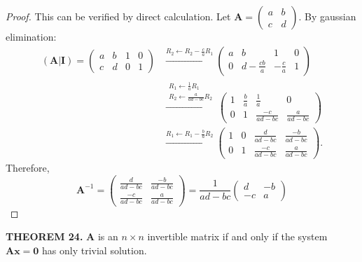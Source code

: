 \documentclass[12pt]{article}
\newcommand{\mat}[1]{\mathbf{#1}}
\newcommand{\theorem}[2]{\textbf{THEOREM #1.} #2}
\begin{document}
\begin{proof}
    This can be verified by direct calculation. Let $\mat{A} = \begin{pmatrix} a & b \\ c & d \end{pmatrix}$. By gaussian elimination:
\begin{align*}
  (\mat{A|I})
= \begin{pmatrix} a & b & 1 & 0 \\ c & d & 0 & 1 \end{pmatrix}
%
&\xrightarrow{R_2 \leftarrow R_2 - \frac{c}{a} R_1}
\begin{pmatrix}
a & b & 1 & 0 \\
0 & d - \frac{cb}{a} & -\frac{c}{a} & 1
\end{pmatrix} \\
%
&\xrightarrow{\substack{R_1 \leftarrow \frac{1}{a} R_1 \\ R_2 \leftarrow \frac{a}{ad - bc} R_2}}
\begin{pmatrix}
1 & \frac{b}{a} & \frac{1}{a} & 0 \\
0 & 1 & \frac{-c}{ad - bc} & \frac{a}{ad - bc}
\end{pmatrix} \\
%
&\xrightarrow{R_1 \leftarrow R_1 - \frac{b}{a} R_2}
\begin{pmatrix}
1 & 0 & \frac{d}{ad - bc} & \frac{-b}{ad - bc} \\
0 & 1 & \frac{-c}{ad - bc} & \frac{a}{ad - bc}
\end{pmatrix}.
\end{align*}
Therefore,
\begin{equation*}
\mat{A}^{-1} =
\begin{pmatrix}
\frac{d}{ad - bc} & \frac{-b}{ad - bc} \\
\frac{-c}{ad - bc} & \frac{a}{ad - bc}
\end{pmatrix}
= \frac{1}{ad-bc} \begin{pmatrix} d & -b \\ -c & a \end{pmatrix}
\end{equation*}
\end{proof}

\theorem{24}{$\mat{A}$ is an $n \times n$ invertible matrix if and only if the system $\mat{Ax} = \mat{0}$ has only trivial solution.}
\end{document}

